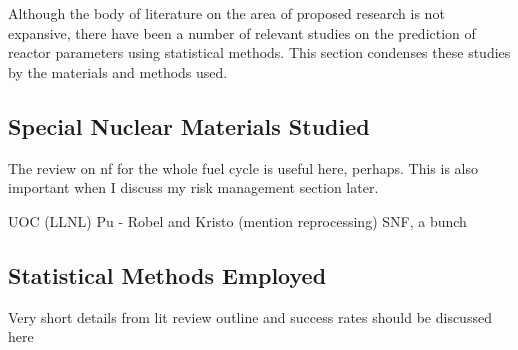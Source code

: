 Although the body of literature on the area of proposed research is not
expansive, there have been a number of relevant studies on the prediction of
reactor parameters using statistical methods. This section condenses these
studies by the materials and methods used.

\subsection{Special Nuclear Materials Studied}

The review on nf for the whole fuel cycle is useful here, perhaps. This is also 
important when I discuss my risk management section later. 

UOC (LLNL)
Pu - Robel and Kristo (mention reprocessing)
SNF, a bunch



\subsection{Statistical Methods Employed}

Very short details from lit review outline and success rates should be 
discussed here

